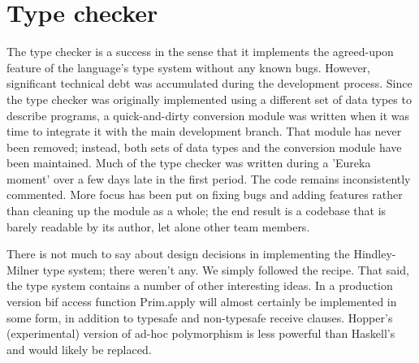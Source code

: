 \section{Type checker}

The type checker is a success in the sense that it implements the agreed-upon feature of the language's type system without any known bugs. However, significant technical debt was accumulated during the development process. Since the type checker was originally implemented using a different set of data types to describe programs, a quick-and-dirty conversion module was written when it was time to integrate it with the main development branch. That module has never been removed; instead, both sets of data types and the conversion module have been maintained. Much of the type checker was written during a 'Eureka moment' over a few days late in the first period. The code remains inconsistently commented. More focus has been put on fixing bugs and adding features rather than cleaning up the module as a whole; the end result is a codebase that is barely readable by its author, let alone other team members.

There is not much to say about design decisions in implementing the Hindley-Milner type system; there weren't any. We simply followed the recipe.
That said, the type system contains a number of other interesting ideas. In a production version bif access function Prim.apply will almost certainly be implemented in some form, in addition to typesafe and non-typesafe receive clauses. Hopper's (experimental) version of ad-hoc polymorphism is less powerful than Haskell's and would likely be replaced.
